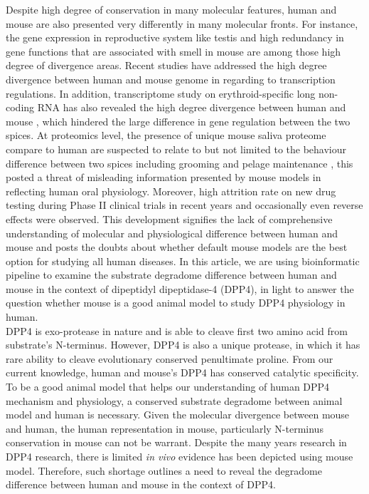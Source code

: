 Despite high degree of conservation in many molecular features, human and mouse are also presented very differently in many molecular fronts. For instance, the gene expression in reproductive system like testis \cite{Chan_2009, Brawand_2011, Necsulea_2014} and high redundancy in gene functions that are associated with smell in mouse \cite{Gilad_2009, Gilad_2003, Young_2002} are among those high degree of divergence areas. Recent studies have addressed the high degree divergence between human and mouse genome in regarding to transcription regulations. \cite{25409824} In addition, transcriptome study on erythroid-specific long non-coding RNA has also revealed the high degree divergence between human and mouse \cite{An_2015}, which hindered the large difference in gene regulation between the two spices. At proteomics level, the presence of unique mouse saliva proteome compare to human are suspected to relate to but not limited to the behaviour difference between two spices including grooming and pelage maintenance \cite{Karn_2013}, this posted a threat of misleading information presented by mouse models in reflecting human oral physiology. Moreover, high attrition rate on new drug testing during Phase II clinical trials in recent years \cite{Arrowsmith_2011} and occasionally even reverse effects were observed. This development signifies the lack of comprehensive understanding of molecular and physiological difference between human and mouse \cite{de_Magalh_es_2014} and posts the doubts about whether default mouse models are the best option for studying all human diseases. In this article, we are using bioinformatic pipeline to examine the substrate degradome difference between human and mouse in the context of dipeptidyl dipeptidase-4 (DPP4), in light to answer the question whether mouse is a good animal model to study DPP4 physiology in human.
\\

DPP4 is exo-protease in nature and is able to cleave first two amino acid from substrate's N-terminus. However, DPP4 is also a unique protease, in which it has rare ability to cleave evolutionary conserved penultimate proline. From our current knowledge, human and mouse's DPP4 has conserved catalytic specificity. To be a good animal model that helps our understanding of human DPP4 mechanism and physiology, a conserved substrate degradome between animal model and human is necessary. Given the molecular divergence between mouse and human, the human representation in mouse, particularly N-terminus conservation in mouse can not be warrant. Despite the many years research in DPP4 research, there is limited \textit{in vivo} evidence has been depicted using mouse model. Therefore, such shortage outlines a need to reveal the degradome difference between human and mouse in the context of DPP4. \\

